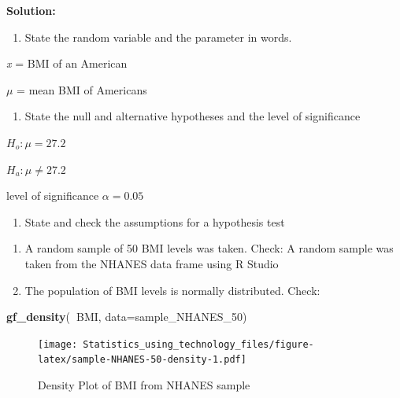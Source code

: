 \documentclass[
]{book}
\newenvironment{Shaded}{\begin{snugshade}}{\end{snugshade}}
\newcommand{\DataTypeTok}[1]{\textcolor[rgb]{0.13,0.29,0.53}{#1}}
\newcommand{\DecValTok}[1]{\textcolor[rgb]{0.00,0.00,0.81}{#1}}
\newcommand{\KeywordTok}[1]{\textcolor[rgb]{0.13,0.29,0.53}{\textbf{#1}}}
\newcommand{\NormalTok}[1]{#1}
\newcommand{\OperatorTok}[1]{\textcolor[rgb]{0.81,0.36,0.00}{\textbf{#1}}}
\providecommand{\tightlist}{%
  \setlength{\itemsep}{0pt}\setlength{\parskip}{0pt}}
\begin{document}
\textbf{Solution:}

\begin{enumerate}
\def\labelenumi{\arabic{enumi}.}
\tightlist
\item
  State the random variable and the parameter in words.
\end{enumerate}

\emph{x} = BMI of an American

\(\mu\) = mean BMI of Americans

\begin{enumerate}
\def\labelenumi{\arabic{enumi}.}
\setcounter{enumi}{1}
\tightlist
\item
  State the null and alternative hypotheses and the level of significance
\end{enumerate}

\(H_o:\mu=27.2\)

\(H_a:\mu\ne 27.2\)

level of significance \(\alpha=0.05\)

\begin{enumerate}
\def\labelenumi{\arabic{enumi}.}
\setcounter{enumi}{2}
\tightlist
\item
  State and check the assumptions for a hypothesis test
\end{enumerate}

\begin{enumerate}
\def\labelenumi{\alph{enumi}.}
\item
  A random sample of 50 BMI levels was taken. Check: A random sample was taken from the NHANES data frame using R Studio
\item
  The population of BMI levels is normally distributed. Check:
\end{enumerate}



\begin{Shaded}
\begin{Highlighting}[]
\KeywordTok{gf_density}\NormalTok{(}\OperatorTok{~}\NormalTok{BMI, }\DataTypeTok{data=}\NormalTok{sample_NHANES_}\DecValTok{50}\NormalTok{)}
\end{Highlighting}
\end{Shaded}

\begin{figure}
\centering
\texttt{[image: Statistics\_using\_technology\_files/figure-latex/sample-NHANES-50-density-1.pdf]}
\caption{\label{fig:sample-NHANES-50-density}Density Plot of BMI from NHANES sample}
\end{figure}
\end{document}
